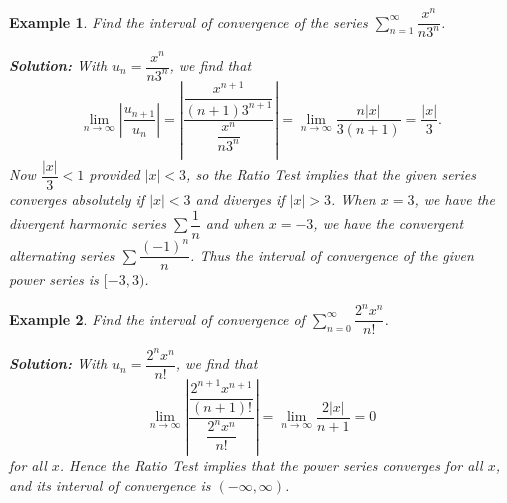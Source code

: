 \documentclass[titlepage,a4paper,12pt]{report}
\newtheorem{example}{Example}[section]
\begin{document}
\begin{example}
Find the interval of convergence of the series $\displaystyle \sum _{n=1}^\infty \dfrac{x^n}{n3^n}$.

\noindent \textbf{Solution:} With $u_n=\dfrac{x^n}{n3^n}$, we find that 
\[\lim _{n\rightarrow \infty }\left|\dfrac{u_{n+1}}{u_n}\right|=\left|\dfrac{\dfrac{x^{n+1}}{(n+1)3^{n+1}}}{\dfrac{x^n}{n3^n}}\right|=\lim _{n\rightarrow \infty}\dfrac{n|x|}{3(n+1)}=\dfrac{|x|}{3}.\]
Now $\dfrac{|x|}{3}<1$ provided $|x|<3$, so the Ratio Test implies that the given series converges absolutely if $|x|<3$ and diverges if $|x|>3$. When $x=3$, we have the divergent harmonic series $\displaystyle \sum \dfrac{1}{n}$ and when $x=-3$, we have the convergent alternating series $\displaystyle \sum \dfrac{(-1)^n}{n}$. Thus the interval of convergence of the given power series is $[-3,3)$.
\end{example}
\begin{example}
Find the interval of convergence of $\displaystyle \sum _{n=0}^\infty \dfrac{2^nx^n}{n!}$.

\noindent \textbf{Solution:} With $u_n=\dfrac{2^nx^n}{n!}$, we find that 
\[\lim _{n\rightarrow \infty}\left|\dfrac{\dfrac{2^{n+1}x^{n+1}}{(n+1)!}}{\dfrac{2^nx^n}{n!}}\right|=\lim _{n\rightarrow \infty}\dfrac{2|x|}{n+1}=0\] for all $x$. Hence the Ratio Test implies that the power series converges for all $x$, and its interval of convergence is $(-\infty, \infty)$. 
\end{example}
\end{document}
